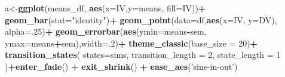 \documentclass[
]{book}
\newenvironment{Shaded}{\begin{snugshade}}{\end{snugshade}}
\newcommand{\DataTypeTok}[1]{\textcolor[rgb]{0.13,0.29,0.53}{#1}}
\newcommand{\DecValTok}[1]{\textcolor[rgb]{0.00,0.00,0.81}{#1}}
\newcommand{\KeywordTok}[1]{\textcolor[rgb]{0.13,0.29,0.53}{\textbf{#1}}}
\newcommand{\NormalTok}[1]{#1}
\newcommand{\OperatorTok}[1]{\textcolor[rgb]{0.81,0.36,0.00}{\textbf{#1}}}
\newcommand{\StringTok}[1]{\textcolor[rgb]{0.31,0.60,0.02}{#1}}
\begin{document}
\begin{Shaded}
\begin{Highlighting}[]
{{{{\NormalTok{a<-}\KeywordTok{ggplot}\NormalTok{(means_df, }\KeywordTok{aes}\NormalTok{(}\DataTypeTok{x=}\NormalTok{IV,}\DataTypeTok{y=}\NormalTok{means, }\DataTypeTok{fill=}\NormalTok{IV))}\OperatorTok{+}
\StringTok{  }\KeywordTok{geom_bar}\NormalTok{(}\DataTypeTok{stat=}\StringTok{"identity"}\NormalTok{)}\OperatorTok{+}
\StringTok{  }\KeywordTok{geom_point}\NormalTok{(}\DataTypeTok{data=}\NormalTok{df,}\KeywordTok{aes}\NormalTok{(}\DataTypeTok{x=}\NormalTok{IV, }\DataTypeTok{y=}\NormalTok{DV), }\DataTypeTok{alpha=}\NormalTok{.}\DecValTok{25}\NormalTok{)}\OperatorTok{+}
\StringTok{  }\KeywordTok{geom_errorbar}\NormalTok{(}\KeywordTok{aes}\NormalTok{(}\DataTypeTok{ymin=}\NormalTok{means}\OperatorTok{-}\NormalTok{sem, }\DataTypeTok{ymax=}\NormalTok{means}\OperatorTok{+}\NormalTok{sem),}\DataTypeTok{width=}\NormalTok{.}\DecValTok{2}\NormalTok{)}\OperatorTok{+}
\StringTok{  }\KeywordTok{theme_classic}\NormalTok{(}\DataTypeTok{base_size =} \DecValTok{20}\NormalTok{)}\OperatorTok{+}
\StringTok{  }\KeywordTok{transition_states}\NormalTok{(}
    \DataTypeTok{states=}\NormalTok{sims,}
    \DataTypeTok{transition_length =} \DecValTok{2}\NormalTok{,}
    \DataTypeTok{state_length =} \DecValTok{1}
\NormalTok{  )}\OperatorTok{+}\KeywordTok{enter_fade}\NormalTok{() }\OperatorTok{+}\StringTok{ }
\StringTok{  }\KeywordTok{exit_shrink}\NormalTok{() }\OperatorTok{+}
\StringTok{  }\KeywordTok{ease_aes}\NormalTok{(}\StringTok{'sine-in-out'}\NormalTok{)}

}}}}
\end{Highlighting}
\end{Shaded}
\end{document}
